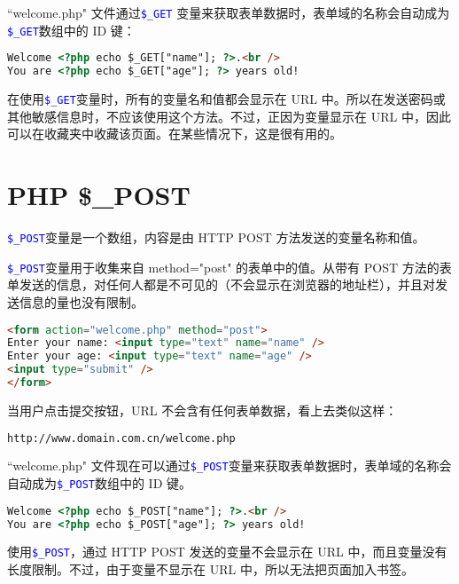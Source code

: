 ``welcome.php" 文件通过\textcolor{Blue}{\texttt{\$\_GET}} 变量来获取表单数据时，表单域的名称会自动成为\textcolor{Blue}{\texttt{\$\_GET}}数组中的 ID 键：

\begin{lstlisting}[language=HTML]
Welcome <?php echo $_GET["name"]; ?>.<br />
You are <?php echo $_GET["age"]; ?> years old!
\end{lstlisting}

在使用\textcolor{Blue}{\texttt{\$\_GET}}变量时，所有的变量名和值都会显示在 URL 中。所以在发送密码或其他敏感信息时，不应该使用这个方法。不过，正因为变量显示在 URL 中，因此可以在收藏夹中收藏该页面。在某些情况下，这是很有用的。


\chapter{PHP \$\_POST}

\textcolor{Blue}{\texttt{\$\_POST}}变量是一个数组，内容是由 HTTP POST 方法发送的变量名称和值。



\textcolor{Blue}{\texttt{\$\_POST}}变量用于收集来自 method="post" 的表单中的值。从带有 POST 方法的表单发送的信息，对任何人都是不可见的（不会显示在浏览器的地址栏），并且对发送信息的量也没有限制。

\begin{lstlisting}[language=HTML]
<form action="welcome.php" method="post">
Enter your name: <input type="text" name="name" />
Enter your age: <input type="text" name="age" />
<input type="submit" />
</form>
\end{lstlisting}

当用户点击提交按钮，URL 不会含有任何表单数据，看上去类似这样：


\begin{lstlisting}[language=bash]
http://www.domain.com.cn/welcome.php
\end{lstlisting}

``welcome.php" 文件现在可以通过\textcolor{Blue}{\texttt{\$\_POST}}变量来获取表单数据时，表单域的名称会自动成为\textcolor{Blue}{\texttt{\$\_POST}}数组中的 ID 键。

\begin{lstlisting}[language=HTML]
Welcome <?php echo $_POST["name"]; ?>.<br />
You are <?php echo $_POST["age"]; ?> years old!
\end{lstlisting}


使用\textcolor{Blue}{\texttt{\$\_POST}}，通过 HTTP POST 发送的变量不会显示在 URL 中，而且变量没有长度限制。不过，由于变量不显示在 URL 中，所以无法把页面加入书签。







